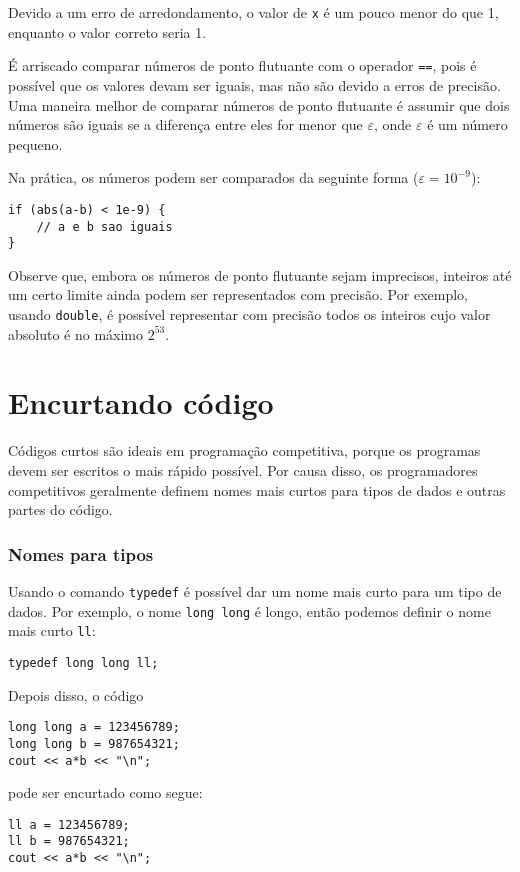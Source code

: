 Devido a um erro de arredondamento, o valor de \texttt{x} é um pouco menor do que 1, enquanto o valor correto seria 1.

É arriscado comparar números de ponto flutuante com o operador \texttt{==}, pois é possível que os valores devam ser iguais, mas não são devido a erros de precisão. Uma maneira melhor de comparar números de ponto flutuante é assumir que dois números são iguais se a diferença entre eles for menor que $\varepsilon$, onde $\varepsilon$ é um número pequeno.

Na prática, os números podem ser comparados da seguinte forma ($\varepsilon=10^{-9}$):

\begin{lstlisting}
if (abs(a-b) < 1e-9) {
    // a e b sao iguais
}
\end{lstlisting}

Observe que, embora os números de ponto flutuante sejam imprecisos, inteiros até um certo limite ainda podem ser representados com precisão. Por exemplo, usando \texttt{double}, é possível representar com precisão todos os inteiros cujo valor absoluto é no máximo $2^{53}$.

\section{Encurtando código}

Códigos curtos são ideais em programação competitiva,
porque os programas devem ser escritos o mais rápido possível.
Por causa disso, os programadores competitivos geralmente definem
nomes mais curtos para tipos de dados e outras partes do código.

\subsubsection{Nomes para tipos}
Usando o comando \texttt{typedef}
é possível dar um nome mais curto para um tipo de dados.
Por exemplo, o nome \texttt{long long} é longo,
então podemos definir o nome mais curto \texttt{ll}:
\begin{lstlisting}
typedef long long ll;
\end{lstlisting}
Depois disso, o código
\begin{lstlisting}
long long a = 123456789;
long long b = 987654321;
cout << a*b << "\n";
\end{lstlisting}
pode ser encurtado como segue:
\begin{lstlisting}
ll a = 123456789;
ll b = 987654321;
cout << a*b << "\n";
\end{lstlisting}

